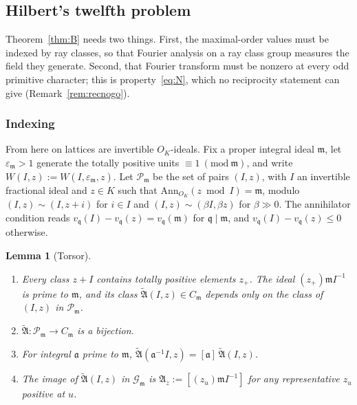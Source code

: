 \documentclass[11pt]{amsart}
\numberwithin{equation}{section}
\theoremstyle{plain}
\newtheorem{lemma}[theorem]{Lemma}
\theoremstyle{definition}
\theoremstyle{remark}
\begin{document}
\subsection{Hilbert's twelfth problem}\label{sec:h12}

Theorem~\ref{thm:B} needs two things. First, the maximal-order values must be indexed by ray classes, so that Fourier analysis on a ray class group measures the field they generate. Second, that Fourier transform must be nonzero at every odd primitive character; this is property~\eqref{eq:N}, which no reciprocity statement can give (Remark~\ref{rem:recnogo}).

\subsubsection*{Indexing}
From here on lattices are invertible \(O_K\)-ideals. Fix a proper integral ideal \(\mathfrak m\), let \(\varepsilon_{\mathfrak m}>1\) generate the totally positive units \(\equiv1\ (\mathrm{mod}\ \mathfrak m)\), and write \(W(I,z):=W(I,\varepsilon_{\mathfrak m},z)\). Let \(\mathcal P_{\mathfrak m}\) be the set of pairs \((I,z)\), with \(I\) an invertible fractional ideal and \(z\in K\) such that \(\mathrm{Ann}_{O_K}(z\bmod I)=\mathfrak m\), modulo \((I,z)\sim(I,z+i)\) for \(i\in I\) and \((I,z)\sim(\beta I,\beta z)\) for \(\beta\gg0\). The annihilator condition reads \(v_{\mathfrak q}(I)-v_{\mathfrak q}(z)=v_{\mathfrak q}(\mathfrak m)\) for \(\mathfrak q\mid\mathfrak m\), and \(v_{\mathfrak q}(I)-v_{\mathfrak q}(z)\le0\) otherwise.

\begin{lemma}[Torsor]\label{lem:torsor}
\begin{enumerate}
\item[(a)] Every class \(z+I\) contains totally positive elements \(z_+\). The ideal \((z_+)\mathfrak mI^{-1}\) is prime to \(\mathfrak m\), and its class \(\widetilde{\mathfrak A}(I,z)\in C_{\mathfrak m}\) depends only on the class of \((I,z)\) in \(\mathcal P_{\mathfrak m}\).
\item[(b)] \(\widetilde{\mathfrak A}:\mathcal P_{\mathfrak m}\to C_{\mathfrak m}\) is a bijection.
\item[(c)] For integral \(\mathfrak a\) prime to \(\mathfrak m\), \(\widetilde{\mathfrak A}(\mathfrak a^{-1}I,z)=[\mathfrak a]\,\widetilde{\mathfrak A}(I,z)\).
\item[(d)] The image of \(\widetilde{\mathfrak A}(I,z)\) in \(\mathcal G_{\mathfrak m}\) is \(\mathfrak A_z:=[(z_u)\mathfrak mI^{-1}]\) for any representative \(z_u\) positive at \(u\).
\end{enumerate}
\end{lemma}
\end{document}
